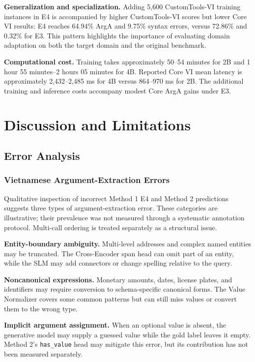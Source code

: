 \documentclass[10pt,twocolumn,a4paper]{article}
\begin{document}
\textbf{Generalization and specialization.} Adding 5,600 CustomTools-VI training instances in E4 is accompanied by higher CustomTools-VI scores but lower Core VI results: E4 reaches 64.94\% ArgA and 9.75\% syntax errors, versus 72.86\% and 0.32\% for E3. This pattern highlights the importance of evaluating domain adaptation on both the target domain and the original benchmark.

\textbf{Computational cost.} Training takes approximately 50--54 minutes for 2B and 1 hour 55 minutes--2 hours 05 minutes for 4B. Reported Core VI mean latency is approximately 2,432--2,485 ms for 4B versus 864--970 ms for 2B. The additional training and inference costs accompany modest Core ArgA gains under E3.

\section{Discussion and Limitations}

\subsection{Error Analysis}
\subsubsection{Vietnamese Argument-Extraction Errors}
Qualitative inspection of incorrect Method 1 E4 and Method 2 predictions suggests three types of argument-extraction error. These categories are illustrative; their prevalence was not measured through a systematic annotation protocol. Multi-call ordering is treated separately as a structural issue.

\textbf{Entity-boundary ambiguity.} Multi-level addresses and complex named entities may be truncated. The Cross-Encoder span head can omit part of an entity, while the SLM may add connectors or change spelling relative to the query.

\textbf{Noncanonical expressions.} Monetary amounts, dates, license plates, and identifiers may require conversion to schema-specific canonical forms. The Value Normalizer covers some common patterns but can still miss values or convert them to the wrong type.

\textbf{Implicit argument assignment.} When an optional value is absent, the generative model may supply a guessed value while the gold label leaves it empty. Method 2's \texttt{has\_value} head may mitigate this error, but its contribution has not been measured separately.
\end{document}
